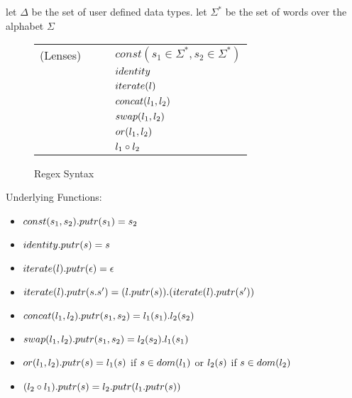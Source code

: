 \documentclass{article}
\begin{document}
let $\Delta$ be the set of user defined data types.
let $\Sigma^*$ be the set of words over the alphabet $\Sigma$\\

\begin{figure}
\begin{tabular}{l@{\ }l@{\ }c@{\ }l}

(Lenses)& \Lens{} & \GEq{} & $const(s_1 \in \Sigma^*,s_2 \in \Sigma^*)$ \\
& & & \GBar{} $identity$\\
& & & \GBar{} $iterate(l)$ \\
& & & \GBar{} $concat(l_1,l_2)$ \\
& & & \GBar{} $swap(l_1,l_2)$ \\
& & & \GBar{} $or(l_1,l_2)$\\
& & & \GBar{} $l_1 \circ l_2$\\
\end{tabular}
\caption{Regex Syntax}
\label{fig:refn-subgrammars}
\end{figure}

Underlying Functions:
\begin{itemize}
\item $const(s_1,s_2).putr(s_1)=s_2$
\item $identity.putr(s)=s$
\item $iterate(l).putr(\epsilon) = \epsilon$
\item $iterate(l).putr(s . s') = (l.putr(s)) . (iterate(l).putr(s'))$
\item $concat(l_1,l_2).putr(s_1,s_2) = l_1(s_1).l_2(s_2)$
\item $swap(l_1,l_2).putr(s_1,s_2) = l_2(s_2).l_1(s_1)$
\item $or(l_1,l_2).putr(s) = l_1(s)$ if $s \in dom(l_1)$ or $l_2(s)$ if $s \in dom(l_2)$
\item $(l_2 \circ l_1).putr(s) = l_2.putr(l_1.putr(s))$
\end{itemize}
\end{document}
